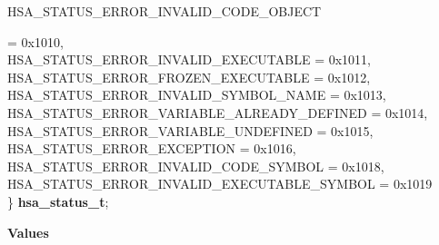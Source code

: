 \documentclass[final,oneside]{book}
\newcommand{\reftyp}[1]{#1}
\newcommand{\refenu}[1]{\reftyp{#1}}
\newenvironment{mylongtable}{\rowcolors{0}{lightgray}{lightgray}\longtable} {
\endlongtable}
\begin{document}
\begin{mylongtable}{@{}p{\textwidth}}
\hspace{1.7em}\hypertarget{group__status_1ggad755322e7ff95456520e8abdbe90d225a152d0a73aaefeeab32845d0d7a1e9952}{\refenu{HSA_\-STATUS_\-ERROR_\-INVALID_\-CODE_\-OBJECT}} = 0x1010,\\
\hspace{1.7em}\hypertarget{group__status_1ggad755322e7ff95456520e8abdbe90d225ae2fcb63555ddbffb6048b7e044501151}{\refenu{HSA_\-STATUS_\-ERROR_\-INVALID_\-EXECUTABLE}} = 0x1011,\\
\hspace{1.7em}\hypertarget{group__status_1ggad755322e7ff95456520e8abdbe90d225a32f01e35216b0a6473cd248db77bf2be}{\refenu{HSA_\-STATUS_\-ERROR_\-FROZEN_\-EXECUTABLE}} = 0x1012,\\
\hspace{1.7em}\hypertarget{group__status_1ggad755322e7ff95456520e8abdbe90d225a763aa9892acea9f7d145c0111247359c}{\refenu{HSA_\-STATUS_\-ERROR_\-INVALID_\-SYMBOL_\-NAME}} = 0x1013,\\
\hspace{1.7em}\hypertarget{group__status_1ggad755322e7ff95456520e8abdbe90d225abff93790fdc804ac87c2299c296cc598}{\refenu{HSA_\-STATUS_\-ERROR_\-VARIABLE_\-ALREADY_\-DEFINED}} = 0x1014,\\
\hspace{1.7em}\hypertarget{group__status_1ggad755322e7ff95456520e8abdbe90d225a4dc84f78ba6a7ac6e5ae26143c17701d}{\refenu{HSA_\-STATUS_\-ERROR_\-VARIABLE_\-UNDEFINED}} = 0x1015,\\
\hspace{1.7em}\hypertarget{group__status_1ggad755322e7ff95456520e8abdbe90d225ac537647317af337965bc115688bb5db7}{\refenu{HSA_\-STATUS_\-ERROR_\-EXCEPTION}} = 0x1016,\\
\hspace{1.7em}\hypertarget{group__status_1ggad755322e7ff95456520e8abdbe90d225a60262f8c37b2e374271d068625f6eed5}{\refenu{HSA_\-STATUS_\-ERROR_\-INVALID_\-CODE_\-SYMBOL}} = 0x1018,\\
\hspace{1.7em}\hypertarget{group__status_1ggad755322e7ff95456520e8abdbe90d225a1db2eecfbdb0ba426626ab7feb0d3719}{\refenu{HSA_\-STATUS_\-ERROR_\-INVALID_\-EXECUTABLE_\-SYMBOL}} = 0x1019\\
\} \hypertarget{group__status_1gad755322e7ff95456520e8abdbe90d225}{\textbf{hsa_\-status_\-t}};\rule[-2ex]{0pt}{0pt}\end{mylongtable}\noindent\textbf{Values}\\[-7mm]
\end{document}
